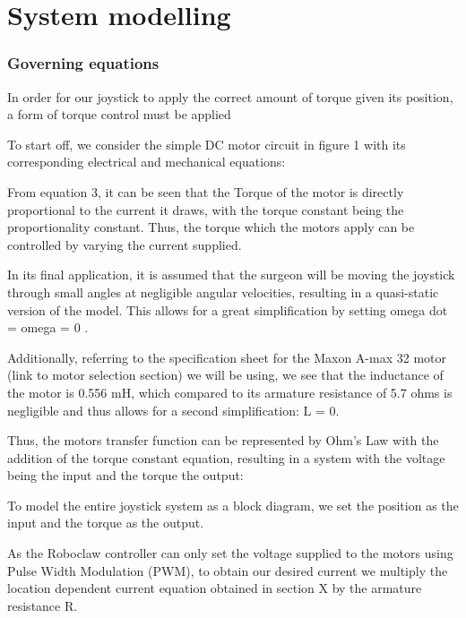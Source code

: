 \section{System modelling}\label{sec:system-modelling}

\subsubsection{Governing equations}\label{governing-equations}

In order for our joystick to apply the correct amount of torque given
its position, a form of torque control must be applied

To start off, we consider the simple DC motor circuit in figure 1 with
its corresponding electrical and mechanical equations:


From equation 3, it can be seen that the Torque of the motor is directly
proportional to the current it draws, with the torque constant being the
proportionality constant. Thus, the torque which the motors apply can be
controlled by varying the current supplied.

In its final application, it is assumed that the surgeon will be moving
the joystick through small angles at negligible angular velocities,
resulting in a quasi-static version of the model. This allows for a
great simplification by setting omega dot = omega = 0 .

Additionally, referring to the specification sheet for the Maxon A-max
32 motor (link to motor selection section) we will be using, we see that
the inductance of the motor is 0.556 mH, which compared to its armature
resistance of 5.7 ohms is negligible and thus allows for a second
simplification: L = 0.

Thus, the motors transfer function can be represented by Ohm's Law with
the addition of the torque constant equation, resulting in a system with
the voltage being the input and the torque the output:


To model the entire joystick system as a block diagram, we set the
position as the input and the torque as the output.

As the Roboclaw controller can only set the voltage supplied to the
motors using Pulse Width Modulation (PWM), to obtain our desired current
we multiply the location dependent current equation obtained in section
X by the armature resistance R.


